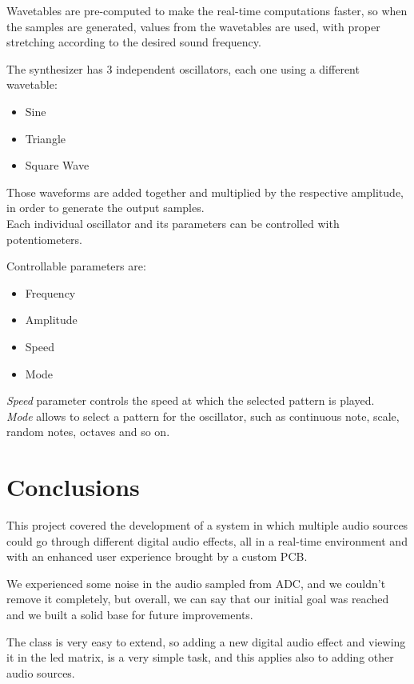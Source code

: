 Wavetables are pre-computed to make the real-time computations faster, so when the samples are generated, values from the wavetables are used, with proper stretching according to the desired sound frequency.\par

The synthesizer has 3 independent oscillators, each one using a different wavetable: 
\begin{itemize}
    \item Sine
    \item Triangle
    \item Square Wave
\end{itemize}

Those waveforms are added together and multiplied by the respective amplitude, in order to generate the output samples. \\
Each individual oscillator and its parameters can be controlled with potentiometers.

\newpage

Controllable parameters are:
\begin{itemize}
    \item Frequency
    \item Amplitude
    \item Speed
    \item Mode
\end{itemize}

\textit{Speed} parameter controls the speed at which the selected pattern is played.\\
\textit{Mode} allows to select a pattern for the oscillator, such as continuous note, scale, random notes, octaves and so on. \\


\section{Conclusions}
This project covered the development of a system in which multiple audio sources could go through different digital audio effects, all in a real-time environment and with an enhanced user experience brought by a custom PCB.\par

We experienced some noise in the audio sampled from ADC, and we couldn't remove it completely, but overall, we can say that our initial goal was reached and we built a solid base for future improvements.\par

The  class is very easy to extend, so adding a new digital audio effect and viewing it in the led matrix, is a very simple task, and this applies also to adding other audio sources.


